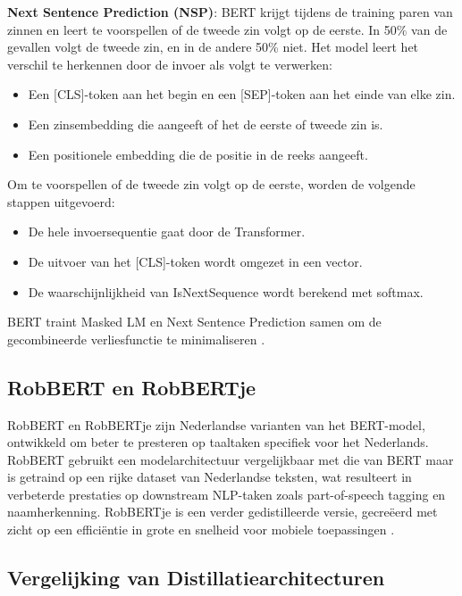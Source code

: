 \textbf{Next Sentence Prediction (NSP)}: BERT krijgt tijdens de training paren van zinnen en leert te voorspellen of de tweede zin volgt op de eerste. In 50\% van de gevallen volgt de tweede zin, en in de andere 50\% niet. Het model leert het verschil te herkennen door de invoer als volgt te verwerken:

\begin{itemize}
    \item Een [CLS]-token aan het begin en een [SEP]-token aan het einde van elke zin.
    \item Een zinsembedding die aangeeft of het de eerste of tweede zin is.
    \item Een positionele embedding die de positie in de reeks aangeeft.
\end{itemize}

Om te voorspellen of de tweede zin volgt op de eerste, worden de volgende stappen uitgevoerd:

\begin{itemize}
    \item De hele invoersequentie gaat door de Transformer.
    \item De uitvoer van het [CLS]-token wordt omgezet in een vector.
    \item De waarschijnlijkheid van IsNextSequence wordt berekend met softmax.
\end{itemize}

BERT traint Masked LM en Next Sentence Prediction samen om de gecombineerde verliesfunctie te minimaliseren \autocite{Devlin2019}.


\subsection{RobBERT en RobBERTje}

RobBERT en RobBERTje zijn Nederlandse varianten van het BERT-model, ontwikkeld om beter te presteren op taaltaken specifiek voor het Nederlands. RobBERT gebruikt een modelarchitectuur vergelijkbaar met die van BERT maar is getraind op een rijke dataset van Nederlandse teksten, wat resulteert in verbeterde prestaties op downstream NLP-taken zoals part-of-speech tagging en naamherkenning. RobBERTje is een verder gedistilleerde versie, gecreëerd met zicht op een efficiëntie in grote en snelheid voor mobiele toepassingen \autocite{Vries2019}.

\subsection{Vergelijking van Distillatiearchitecturen}

